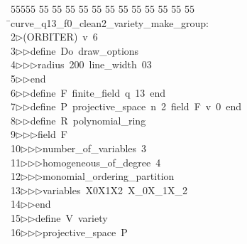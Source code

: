 %
%
\begin{tabbing}
55555 \= 55 \= 55 \= 55 \= 55 \= 55 \= 55 \= 55 \= 55 \= 55 \= 55 \= 55 \= 55 \= \>curve\_q13\_f0\_clean2\_variety\_make\_group:\\[0pt]
2\>$\triangleright$\>(ORBITER)\ v\ 6\ \\[0pt]
3\>$\triangleright$\>$\triangleright$\>define\ Do\ draw\_options\ \\[0pt]
4\>$\triangleright$\>$\triangleright$\>$\triangleright$\>radius\ 200\ line\_width\ 03\ \\[0pt]
5\>$\triangleright$\>$\triangleright$\>end\ \\[0pt]
6\>$\triangleright$\>$\triangleright$\>define\ F\ finite\_field\ q\ 13\ end\ \\[0pt]
7\>$\triangleright$\>$\triangleright$\>define\ P\ projective\_space\ n\ 2\ field\ F\ v\ 0\ end\ \\[0pt]
8\>$\triangleright$\>$\triangleright$\>define\ R\ polynomial\_ring\ \\[0pt]
9\>$\triangleright$\>$\triangleright$\>$\triangleright$\>field\ F\ \\[0pt]
10\>$\triangleright$\>$\triangleright$\>$\triangleright$\>number\_of\_variables\ 3\ \\[0pt]
11\>$\triangleright$\>$\triangleright$\>$\triangleright$\>homogeneous\_of\_degree\ 4\ \\[0pt]
12\>$\triangleright$\>$\triangleright$\>$\triangleright$\>monomial\_ordering\_partition\ \\[0pt]
13\>$\triangleright$\>$\triangleright$\>$\triangleright$\>variables\ X0X1X2\ X\_0X\_1X\_2\ \\[0pt]
14\>$\triangleright$\>$\triangleright$\>end\ \\[0pt]
15\>$\triangleright$\>$\triangleright$\>define\ V\ variety\ \\[0pt]
16\>$\triangleright$\>$\triangleright$\>$\triangleright$\>projective\_space\ P\ \\[0pt]

\end{tabbing}
